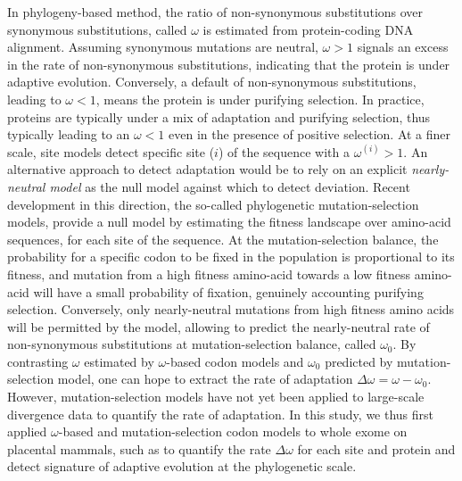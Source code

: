\documentclass{article}
\begin{document}
In phylogeny-based method, the ratio of non-synonymous substitutions over synonymous substitutions, called $\omega$ is estimated from protein-coding DNA alignment\cite{muse_likelihood_1994,goldman_codon-based_1994}.
Assuming synonymous mutations are neutral, $\omega>1$ signals an excess in the rate of non-synonymous substitutions, indicating that the protein is under adaptive evolution.
Conversely, a default of non-synonymous substitutions, leading to $\omega<1$, means the protein is under purifying selection.
In practice, proteins are typically under a mix of adaptation and purifying selection, thus typically leading to an $\omega<1$ even in the presence of positive selection.
At a finer scale, site models detect specific site ($i$) of the sequence with a $\omega^{(i)}>1$\cite{yang_codon-substitution_2000, kosiol_patterns_2008}.
An alternative approach to detect adaptation would be to rely on an explicit \textit{nearly-neutral model} as the null model against which to detect deviation.
Recent development in this direction, the so-called phylogenetic mutation-selection models, provide a null model by estimating the fitness landscape over amino-acid sequences, for each site of the sequence\cite{yang_mutation-selection_2008, halpern_evolutionary_1998, rodrigue_mechanistic_2010}.
At the mutation-selection balance, the probability for a specific codon to be fixed in the population is proportional to its fitness, and mutation from a high fitness amino-acid towards a low fitness amino-acid will have a small probability of fixation, genuinely accounting purifying selection.
Conversely, only nearly-neutral mutations from high fitness amino acids will be permitted by the model, allowing to predict the nearly-neutral rate of non-synonymous substitutions at mutation-selection balance, called $\omega_{0}$.
By contrasting $\omega$ estimated by $\omega$-based codon models and $\omega_{0}$ predicted by mutation-selection model, one can hope to extract the rate of adaptation $\Delta \omega = \omega - \omega_{0}$.
However, mutation-selection models have not yet been applied to large-scale divergence data to quantify the rate of adaptation\cite{rodrigue_detecting_2016}.
In this study, we thus first applied $\omega$-based and mutation-selection codon models to whole exome on placental mammals, such as to quantify the rate $\Delta \omega$ for each site and protein and detect signature of adaptive evolution at the phylogenetic scale.
\end{document}
